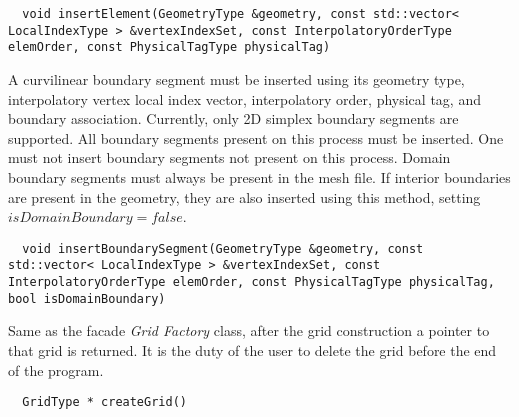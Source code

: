 \begin{mybox}
\begin{lstlisting}
  void insertElement(GeometryType &geometry, const std::vector< LocalIndexType > &vertexIndexSet, const InterpolatoryOrderType elemOrder, const PhysicalTagType physicalTag)
\end{lstlisting}
\end{mybox}


\noindent
A curvilinear boundary segment must be inserted using its geometry type, interpolatory vertex local index vector, interpolatory order, physical tag, and boundary association. Currently, only 2D simplex boundary segments are supported. All boundary segments present on this process must be inserted. One must not insert boundary segments not present on this process. Domain boundary segments must always be present in the mesh file. If interior boundaries are present in the geometry, they are also inserted using this method, setting $isDomainBoundary = false$. \\

\begin{mybox}
\begin{lstlisting}
  void insertBoundarySegment(GeometryType &geometry, const std::vector< LocalIndexType > &vertexIndexSet, const InterpolatoryOrderType elemOrder, const PhysicalTagType physicalTag, bool isDomainBoundary)
\end{lstlisting}
\end{mybox}


\noindent
Same as the facade \textit{Grid Factory} class, after the grid construction a pointer to that grid is returned. It is the duty of the user to delete the grid before the end of the program.

\begin{mybox}
\begin{lstlisting}
  GridType * createGrid()
\end{lstlisting}
\end{mybox}
